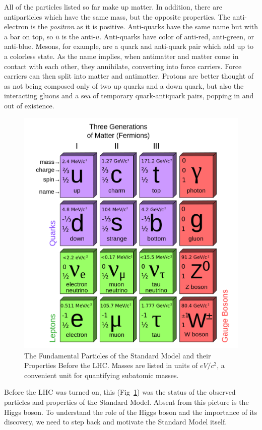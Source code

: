 All of the particles listed so far make up matter. In addition, there are antiparticles which have the same mass, but the opposite properties. The anti-electron is the \textit{positron} as it is positive. Anti-quarks have the same name but with a bar on top, so $\bar{u}$ is the anti-$u$. Anti-quarks have color of anti-red, anti-green, or anti-blue. Mesons, for example, are a quark and anti-quark pair which add up to a colorless state. As the name implies, when antimatter and matter come in contact with each other, they annihilate, converting into force carriers. Force carriers can then split into matter and antimatter. Protons are better thought of as not being composed only of two up quarks and a down quark, but also the interacting gluons and a sea of temporary quark-antiquark pairs, popping in and out of existence.

\begin{figure}[hbt]
\begin{center}
\includegraphics[width=.7\linewidth]{Introduction/figures/fundamentals.png}
\caption[Fundamental Particles of The Standard Model Before the LHC - FIND BETTER SOURCE]{The Fundamental Particles of the Standard Model and their Properties Before the LHC. Masses are listed in units of $eV/c^2$, a convenient unit for quantifying subatomic masses.}
\label{fig:fundamentals}
\end{center}
\end{figure}

Before the LHC was turned on, this (Fig~\ref{fig:fundamentals}) was the status of the observed particles and properties of the Standard Model. Absent from this picture is the Higgs boson. To understand the role of the Higgs boson and the importance of its discovery, we need to step back and motivate the Standard Model itself.

